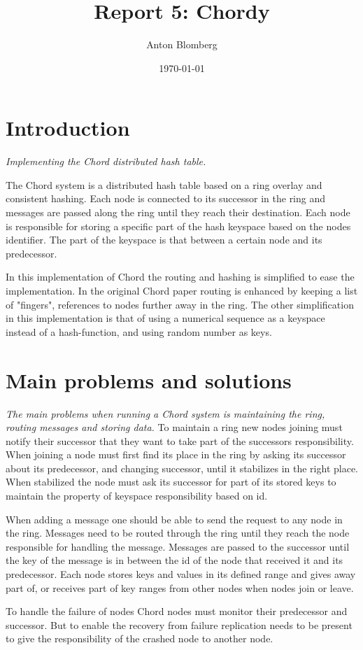 \documentclass[a4paper, 11pt]{article}
\title{Report 5: Chordy}
\author{Anton Blomberg}
\date{\today{}}
\begin{document}
\maketitle

\section{Introduction}

\textit{Implementing the Chord distributed hash table.}

The Chord system is a distributed hash table based on a ring overlay and consistent hashing. Each node is connected to its successor in the
ring and messages are passed along the ring until they reach their destination. Each node is responsible for storing a specific part of the
hash keyspace based on the nodes identifier. The part of the keyspace is that between a certain node and its predecessor.
\par
In this implementation of Chord the routing and hashing is simplified to ease the implementation. In the original Chord paper routing is
enhanced by keeping a list of "fingers", references to nodes further away in the ring. The other simplification in this implementation
is that of using a numerical sequence as a keyspace instead of a hash-function, and using random number as keys.

\section{Main problems and solutions}

\textit{The main problems when running a Chord system is maintaining the ring, routing messages and storing data.}
To maintain a ring new nodes joining must notify their successor that they want to take part of the successors responsibility. When joining
a node must first find its place in the ring by asking its successor about its predecessor, and changing successor, until it stabilizes
in the right place. When stabilized the node must ask its successor for part of its stored keys to maintain the property of keyspace
responsibility based on id.
\par
When adding a message one should be able to send the request to any node in the ring. Messages need to be routed through the ring until they
reach the node responsible for handling the message. Messages are passed to the successor until the key of the message is in between the id of
the node that received it and its predecessor. Each node stores keys and values in its defined range and gives away part of, or receives part
of key ranges from other nodes when nodes join or leave.
\par
To handle the failure of nodes Chord nodes must monitor their predecessor and successor. But to enable the recovery from failure replication
needs to be present to give the responsibility of the crashed node to another node.
\end{document}
